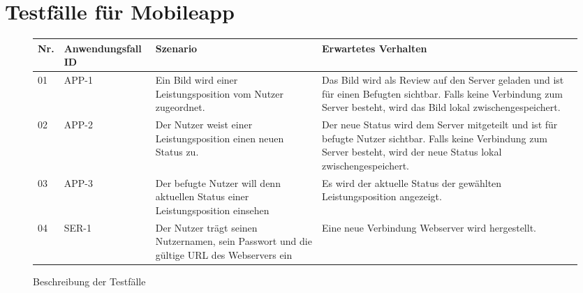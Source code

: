 \newpage

\section{Testfälle für Mobileapp}

\begin{figure}[!h]
	\begin{center}
		\begin{tabularx}{\textwidth}{ p{} | p{} | p{} | X }
			\textbf{Nr.} & \textbf{Anwendungsfall ID} & \textbf{Szenario} & \textbf{Erwartetes Verhalten} \\ \hline
			01 & APP-1 & Ein Bild wird einer Leistungsposition vom Nutzer zugeordnet. & Das Bild wird als Review auf den Server geladen und ist für einen Befugten sichtbar. Falls keine Verbindung zum Server besteht, wird das Bild lokal zwischengespeichert. \\ \hline
			02 & APP-2 & Der Nutzer weist einer Leistungsposition einen neuen Status zu. & Der neue Status wird dem Server mitgeteilt und ist für befugte Nutzer sichtbar. Falls keine Verbindung zum Server besteht, wird der neue Status lokal zwischengespeichert. \\ \hline
            03 & APP-3 & Der befugte Nutzer will denn aktuellen Status einer Leistungsposition einsehen & Es wird der aktuelle Status der gewählten Leistungsposition angezeigt. \\ \hline
            04 & SER-1 & Der Nutzer trägt seinen Nutzernamen, sein Passwort und die gültige URL des Webservers ein & Eine neue Verbindung Webserver wird hergestellt. \\ \hline
		\end{tabularx}	
	\end{center}
	\caption{Beschreibung der Testfälle}
	\label{fig:testfaelle-mobile-app-tabelle}
\end{figure}